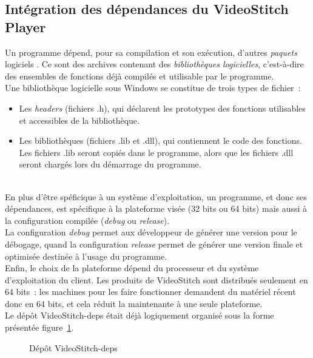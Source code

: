 \subsection{Intégration des dépendances du VideoStitch Player}
\label{integration-dependances-player}
Un programme dépend, pour sa compilation et son exécution, d'autres \emph{paquets} logiciels
\cite{dependance-logicielle}. Ce sont des archives contenant des \emph{bibliothèques logicielles},
c'est-à-dire des ensembles de fonctions déjà compilés et utilisable par le programme.\\
Une bibliothèque logicielle sous Windows se constitue de trois types de fichier\cite{bibliotheque-logicielle}~:
\begin{itemize}
  \item Les \textit{headers} (fichiers .h), qui déclarent les prototypes des fonctions utilisables
  et accessibles de la bibliothèque.
  \item Les bibliothèques (fichiers .lib et .dll), qui contiennent le code des fonctions.
  Les fichiers .lib seront copiés dans le programme, alors que les fichiers .dll seront
  chargés lors du démarrage du programme\cite{bibliotheque-logicielle}.
\end{itemize}
\ \\
En plus d'être spéficique à un système d'exploitation, un programme, et donc
ses dépendances, est spécifique à la plateforme visée (32 bits ou 64 bits)\cite{64-bit-computing}
mais aussi à la configuration compilée (\textit{debug} ou \textit{release})\cite{msdn-debug-release}.\\
La configuration \textit{debug} permet aux développeur de générer une version pour le débogage,
quand la configuration \textit{release} permet de générer une version finale et optimisée destinée
à l'usage du programme. \\
Enfin, le choix de la plateforme dépend du processeur et du
système d'exploitation du client. Les produits de VideoStitch sont distribués
seulement en 64 bits~: les machines pour les faire fonctionner demandent du matériel
récent donc en 64 bits, et cela réduit la maintenante à une seule plateforme.\\
\newline
Le dépôt VideoStitch-deps était déjà logiquement organisé sous la forme présentée figure~\ref{videostitch-deps}.
\begin{figure}[H]
  \caption{Dépôt VideoStitch-deps}
  \label{videostitch-deps}
\end{figure}
